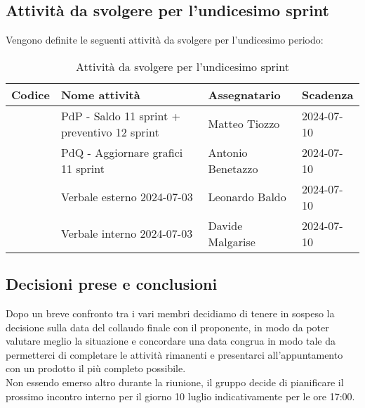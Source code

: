 \documentclass[italian,12pt]{article}
\begin{document}
\newpage
\subsection{Attività da svolgere per l'undicesimo sprint}
Vengono definite le seguenti attività da svolgere per l'undicesimo periodo:
\begin{table}[!h]
	\centering
	\begin{tabular}{ |l||p{7cm}|l|l| }
		\hline
		\textbf{Codice}    & \textbf{Nome attività}                           & \textbf{Assegnatario} & \textbf{Scadenza} \\
		\hline
		\mySkip[86bzjkp80] & PdP - Saldo 11 sprint + preventivo 12 sprint     & Matteo Tiozzo         & 2024-07-10 \\
		\mySkip[86bzjkpg8] & PdQ - Aggiornare grafici 11 sprint               & Antonio Benetazzo     & 2024-07-10 \\
		\mySkip[86bzjkpx9] & Verbale esterno 2024-07-03                       & Leonardo Baldo        & 2024-07-10 \\
		\mySkip[86bzjkpy4] & Verbale interno 2024-07-03                       & Davide Malgarise      & 2024-07-10 \\
		\hline
	\end{tabular}
	\caption{Attività da svolgere per l'undicesimo sprint}
\end{table}

\subsection{Decisioni prese e conclusioni}
Dopo un breve confronto tra i vari membri decidiamo di tenere in sospeso la decisione sulla data del collaudo finale con il proponente, in modo da poter valutare meglio la situazione e concordare una data congrua in modo tale da permetterci di completare le attività rimanenti e presentarci all'appuntamento con un prodotto il più completo possibile. \\
Non essendo emerso altro durante la riunione, il gruppo decide di pianificare il prossimo incontro interno per il giorno 10 luglio indicativamente per le ore 17:00.
\end{document}
